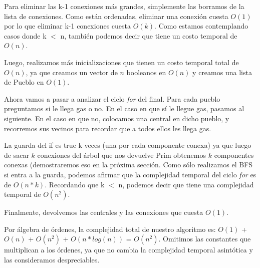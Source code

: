 Para eliminar las k-1 conexiones más grandes, simplemente las borramos de la lista de conexiones. Como están ordenadas, eliminar una conexión cuesta $O(1)$ por lo que eliminar k-1 conexiones cuesta $O(k)$. Como estamos contemplando casos donde k  $<$ n, también podemos decir que tiene un costo temporal de $O(n)$.

Luego, realizamos más inicializaciones que tienen un costo temporal total de $O(n)$, ya que creamos un vector de $n$ booleanos en $O(n)$ y creamos una lista de Pueblo en $O(1)$.

Ahora vamos a pasar a analizar el ciclo \emph{for} del final. Para cada pueblo preguntamos si le llega gas o no. En el caso en que sí le llegue gas, pasamos al siguiente. En el caso en que no, colocamos una central en dicho pueblo, y recorremos sus vecinos para recordar que a todos ellos les llega gas.

La guarda del if es true k veces (una por cada componente conexa) ya que luego de sacar $k$ conexiones del árbol que nos devuelve Prim obtenemos $k$ componentes conexas (demostraremos eso en la próxima sección. Como sólo realizamos el BFS si entra a la guarda, podemos afirmar que la complejidad temporal del ciclo \emph{for} es de $O(n*k)$. Recordando que k $<$ n, podemos decir que tiene una complejidad temporal de $O(n^2)$.

Finalmente, devolvemos las centrales y las conexiones que cuesta $O(1)$.

Por álgebra de órdenes, la complejidad total de nuestro algoritmo es: $O(1)$ + $O(n)$ + $O(n^2)$ + $O(n*log(n))$ = $O(n^2)$. Omitimos las constantes que multiplican a los órdenes, ya que no cambia la complejidad temporal asintótica y las consideramos despreciables.